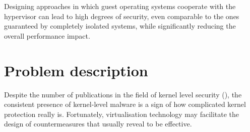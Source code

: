 Designing approaches in which guest operating systems cooperate with the hypervisor can lead to high degrees of security, even comparable to the ones guaranteed by completely isolated systems, while significantly reducing the overall performance impact.


\section{Problem description}
Despite the number of publications in the field of kernel level security (\cite{rootkitdetection, rootkitdetection2, HookSafe}), the consistent presence of kernel-level malware is a sign of how complicated kernel protection really is. 
Fortunately, virtualisation technology may facilitate the design of countermeasures that usually reveal to be effective. 

